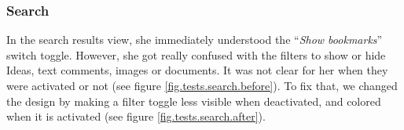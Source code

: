 \documentclass[a4paper,12pt, oneside]{article}
\begin{document}


\subsubsection*{Search}
In the search results view, she immediately understood the “\emph{Show bookmarks}” switch toggle.
However, she got really confused with the filters to show or hide Ideas, text comments, images or documents.
It was not clear for her when they were activated or not (see figure \ref{fig.tests.search.before}).
To fix that, we changed the design by making a filter toggle less visible when deactivated, and colored when it is activated (see figure \ref{fig.tests.search.after}).
\end{document}
